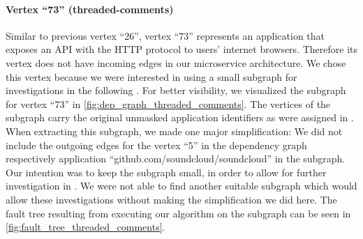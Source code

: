 
\paragraph{Vertex ``73'' (threaded-comments)} Similar to previous vertex ``26'', vertex ``73'' represents an application that exposes an API with the HTTP protocol to users' internet browsers. Therefore its vertex does not have incoming edges in our microservice architecture. We chose this vertex because we were interested in using a small subgraph for investigations in the following . For better visibility, we visualized the subgraph for vertex ``73'' in \autoref{fig:dep_graph_threaded_comments}. The vertices of the subgraph carry the original unmasked application identifiers as were assigned in . When extracting this subgraph, we made one major simplification: We did not include the outgoing edges for the vertex ``5'' in the dependency graph respectively application ``github.com/soundcloud/soundcloud'' in the subgraph. Our intention was to keep the subgraph small, in order to allow for further investigation in . We were not able to find another suitable subgraph which would allow these investigations without making the simplification we did here. The fault tree resulting from executing our algorithm on the subgraph can be seen in \autoref{fig:fault_tree_threaded_comments}.


